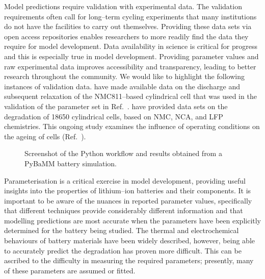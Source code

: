 \documentclass[journal=jacsat,manuscript=article]{achemso}
\begin{document}
Model predictions require validation with experimental data. 
The validation requirements often call for long--term cycling experiments that many institutions do not have the facilities to carry out themselves. 
Providing these data sets via open access repositories enables researchers to more readily find the data they require for model development. 
Data availability in science is critical for progress and this is especially true in model development.
Providing parameter values and raw experimental data improves accessibility and transparency, leading to better research throughout the community. 
We would like to highlight the following instances of validation data.
\citeauthor{Chen2020} have made available data on the discharge and subsequent relaxation of the NMC811--based cylindrical cell that was used in the validation of the parameter set in Ref.~.\cite{Chen2020}
\citeauthor{Devie_2018} have provided data sets on the degradation of 18650 cylindrical cells, based on NMC, NCA, and LFP chemistries.
This ongoing study examines the influence of operating conditions on the ageing of cells (Ref.~).\cite{Devie_2018}

\begin{figure}[h]
    \centering
    \caption{\label{fig:pybamm} Screenshot of the Python workflow and results obtained from a PyBaMM battery simulation.} 
\end{figure}

Parameterisation is a critical exercise in model development, providing useful insights into the properties of lithium--ion batteries and their components. 
It is important to be aware of the nuances in reported parameter values, specifically that different techniques provide considerably different information and that modelling predictions are most accurate when the parameters have been explicitly determined for the battery being studied. 
The thermal and electrochemical behaviours of battery materials have been widely described, however, being able to accurately predict the degradation has proven more difficult. 
This can be ascribed to the difficulty in measuring the required parameters; presently, many of these parameters are assumed or fitted. 
\end{document}
